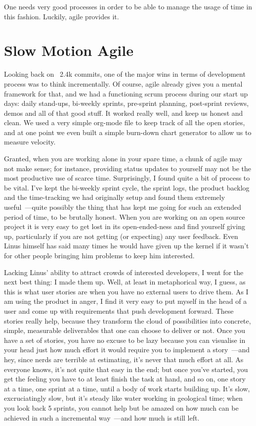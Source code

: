 \documentclass{book}
\begin{document}
One needs very good processes in order to be able to manage the usage
of time in this fashion. Luckily, agile provides it.

\section{Slow Motion Agile}

Looking back on ~2.4k commits, one of the major wins in terms of
development process was to think incrementally. Of course, agile
already gives you a mental framework for that, and we had a
functioning scrum process during our start up days: daily stand-ups,
bi-weekly sprints, pre-sprint planning, post-sprint reviews, demos and
all of that good stuff. It worked really well, and keep us honest and
clean. We used a very simple org-mode file to keep track of all the
open stories, and at one point we even built a simple burn-down chart
generator to allow us to measure velocity.

Granted, when you are working alone in your spare time, a chunk of
agile may not make sense; for instance, providing status updates to
yourself may not be the most productive use of scarce
time. Surprisingly, I found quite a bit of process to be vital. I've
kept the bi-weekly sprint cycle, the sprint logs, the product backlog
and the time-tracking we had originally setup and found them extremely
useful~---quite possibly the thing that has kept me going for such an
extended period of time, to be brutally honest. When you are working
on an open source project it is very easy to get lost in its
open-ended-ness and find yourself giving up, particularly if you are
not getting (or expecting) any user feedback. Even Linus himself has
said many times he would have given up the kernel if it wasn't for
other people bringing him problems to keep him interested.

Lacking Linus' ability to attract crowds of interested developers, I
went for the next best thing: I made them up. Well, at least in
metaphorical way, I guess, as this is what user stories are when you
have no external users to drive them. As I am using the product in
anger, I find it very easy to put myself in the head of a user and
come up with requirements that push development forward. These stories
really help, because they transform the cloud of possibilities into
concrete, simple, measurable deliverables that one can choose to
deliver or not. Once you have a set of stories, you have no excuse to
be lazy because you can visualise in your head just how much effort it
would require you to implement a story~---and hey, since nerds are
terrible at estimating, it's never that much effort at all. As
everyone knows, it's not quite that easy in the end; but once you've
started, you get the feeling you have to at least finish the task at
hand, and so on, one story at a time, one sprint at a time, until a
body of work starts building up. It's slow, excruciatingly slow, but
it's steady like water working in geological time; when you look back
5 sprints, you cannot help but be amazed on how much can be achieved
in such a incremental way~---and how much is still left.
\end{document}
